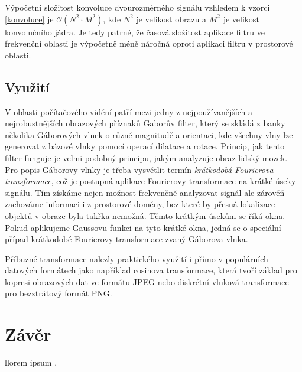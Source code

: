 \documentclass[11pt,a4paper]{article}
\begin{document}
Výpočetní složitost konvoluce dvourozměrného signálu vzhledem k vzorci \ref{konvoluce} je 
$\mathcal{O}(N^2 \cdot M^2)$, kde $N^2$ je velikost obrazu a $M^2$ je velikost konvolučního jádra. Je 
tedy patrné, že časová složitost aplikace filtru ve frekvenční oblasti je výpočetně méně náročná oproti aplikaci 
filtru v prostorové oblasti. 

\subsection{Využití}
V oblasti počítačového vidění patří mezi jedny z nejpoužívanějších a nejrobustnějších obrazových příznaků 
Gaborův filter, který se skládá z banky několika Gáborových vlnek o různé magnitudě a orientaci, kde všechny
vlny lze generovat z bázové vlnky pomocí operací dilatace a rotace. Princip, jak tento filter funguje je velmi 
podobný principu, jakým analyzuje obraz lidský mozek. Pro popis Gáborovy vlnky je třeba vysvětlit termín
\textit{krátkodobá Fourierova transformace}, což je postupná aplikace Fourierovy transformace na krátké
úseky signálu. Tím získáme nejen možnost frekvenčně analyzovat signál ale zárověň zachováme informaci i 
z prostorové domény, bez které by přesná lokalizace objektů v obraze byla takřka nemožná. Těmto krátkým
úsekům se říká okna. Pokud aplikujeme Gaussovu funkci na tyto krátké okna, jedná se o speciální případ
krátkodobé Fourierovy transformace zvaný Gáborova vlnka.

Příbuzné transformace nalezly praktického využití i přímo v populárních datových formátech jako například
cosinova transformace, která tvoří základ pro kopresi obrazových dat ve formátu JPEG nebo diskrétní vlnková 
transformace pro bezztrátový formát PNG.

\section{Závěr}
llorem ipsum \cite{pt}.




\end{document}
